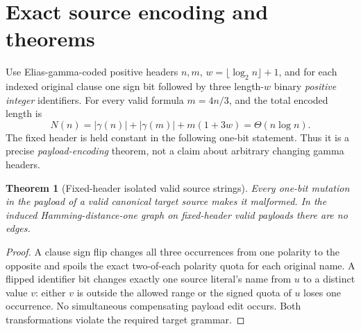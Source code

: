 \documentclass[11pt]{article}
\newtheorem{theorem}{Theorem}
\begin{document}
\section{Exact source encoding and theorems}
Use Elias-gamma-coded positive headers $n,m$, $w=\lfloor\log_2 n\rfloor+1$, and for each indexed original clause one sign bit followed by three length-$w$ binary \emph{positive integer} identifiers. For every valid formula $m=4n/3$, and the total encoded length is
\[
N(n)=|\gamma(n)|+|\gamma(m)|+m(1+3w)=\Theta(n\log n).
\]
The fixed header is held constant in the following one-bit statement. Thus it is a precise \emph{payload-encoding} theorem, not a claim about arbitrary changing gamma headers.

\begin{theorem}[Fixed-header isolated valid source strings]
Every one-bit mutation in the payload of a valid canonical target source makes it malformed. In the induced Hamming-distance-one graph on fixed-header \emph{valid} payloads there are no edges.
\end{theorem}
\begin{proof}
A clause sign flip changes all three occurrences from one polarity to the opposite and spoils the exact two-of-each polarity quota for each original name. A flipped identifier bit changes exactly one source literal's name from $u$ to a distinct value $v$: either $v$ is outside the allowed range or the signed quota of $u$ loses one occurrence. No simultaneous compensating payload edit occurs. Both transformations violate the required target grammar.
\end{proof}
\end{document}
